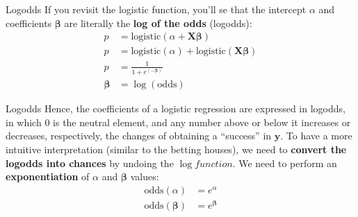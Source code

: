 \begin{frame}{Logodds}
	If you revisit the logistic function, you'll se that the intercept $\alpha$
	and coefficients $\boldsymbol{\beta}$ are literally the \textbf{log of the odds}
	(logodds):
	$$
		\begin{aligned}
			p                  & = \text{logistic}(\alpha +  \mathbf{X} \boldsymbol{\beta} )                 \\
			p                  & = \text{logistic}(\alpha) + \text{logistic}( \mathbf{X} \boldsymbol{\beta}) \\
			p                  & = \frac{1}{1 + e^{(-\boldsymbol{\beta})}}                                   \\
			\boldsymbol{\beta} & = \log(\text{odds})
		\end{aligned}
	$$
\end{frame}

\begin{frame}{Logodds}
	Hence, the coefficients of a logistic regression are expressed in logodds,
	in which $0$ is the neutral element,
	and any number above or below it increases or decreases, respectively,
	the changes of obtaining a ``success'' in $\mathbf{y}$.
	To have a more intuitive interpretation (similar to the betting houses),
	we need to \textbf{convert the logodds into chances} by undoing the $\log function$.
	We need to perform an \textbf{exponentiation} of $\alpha$ and $\boldsymbol{\beta}$
	values:
	$$
		\begin{aligned}
			\text{odds}(\alpha)               & = e^\alpha               \\
			\text{odds}({\boldsymbol{\beta}}) & = e^{\boldsymbol{\beta}}
		\end{aligned}
	$$
\end{frame}
